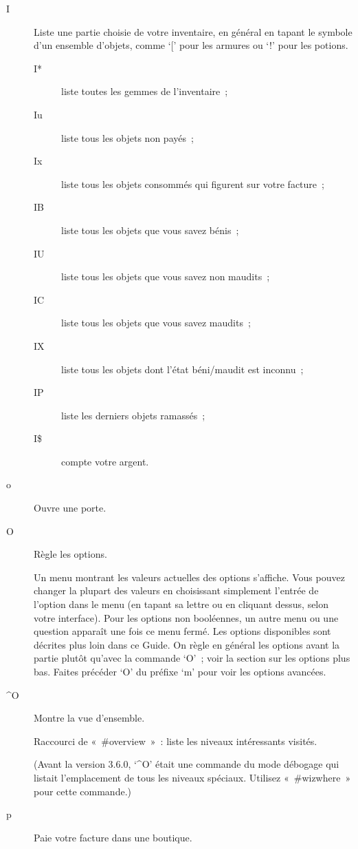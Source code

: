 \documentclass[titlepage]{article}
\begin{document}
\begin{description}
\item[{I}]
Liste une partie choisie de votre inventaire, en général en tapant le
symbole d'un ensemble d'objets, comme `[' pour les armures ou `!'
pour les potions.
\begin{description}
\item[{I*}]
liste toutes les gemmes de l'inventaire~;
\item[{Iu}]
liste tous les objets non payés~;
\item[{Ix}]
liste tous les objets consommés qui figurent sur votre facture~;
\item[{IB}]
liste tous les objets que vous savez bénis~;
\item[{IU}]
liste tous les objets que vous savez non maudits~;
\item[{IC}]
liste tous les objets que vous savez maudits~;
\item[{IX}]
liste tous les objets dont l'état béni/maudit est inconnu~;
\item[{IP}]
liste les derniers objets ramassés~;
\item[{I\$}]
compte votre argent.
\end{description}

\item[{o}]
Ouvre une porte.

\item[{O}]
Règle les options.


Un menu montrant les valeurs actuelles des options s'affiche.
Vous pouvez changer la plupart des valeurs en choisissant simplement
l'entrée de l'option dans le menu (en tapant sa lettre ou en cliquant
dessus, selon votre interface).
Pour les options non booléennes, un autre menu ou une question apparaît
une fois ce menu fermé.
Les options disponibles sont décrites plus loin dans ce Guide.
On règle en général les options avant la partie plutôt qu'avec la commande
`O'~; voir la section sur les options plus bas.
Faites précéder `O' du préfixe `m' pour voir les options
avancées.

\item[{\textasciicircum{}O}]
Montre la vue d'ensemble.


Raccourci de «~\#overview~»~: liste les niveaux intéressants
visités.


(Avant la version 3.6.0, `\textasciicircum{}O' était une commande du mode débogage
qui listait l'emplacement de tous les niveaux spéciaux.
Utilisez «~\#wizwhere~» pour cette commande.)

\item[{p}]
Paie votre facture dans une boutique.


\end{description}
\end{document}
